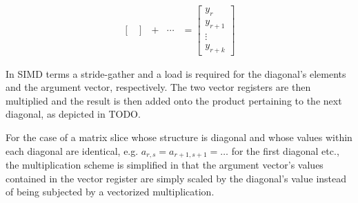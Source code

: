 \documentclass{article}
\begin{document}
\begin{equation}
\begin{matrix}
\begin{bmatrix}
                                                                              \end{bmatrix} & + & \cdots & = \begin{bmatrix}
                                                                                                                 y_{r} \\
                                                                                                                 y_{r+1} \\
                                                                                                                 \vdots \\
                                                                                                                 y_{r+k}
                                                                                                                \end{bmatrix}
        \end{matrix}
      \end{equation}

      In SIMD terms a stride-gather and a load is required for the diagonal's elements and the argument vector, respectively. The two vector registers are then multiplied and the result is then added onto the product pertaining to the next diagonal, as depicted in TODO.

      For the case of a matrix slice whose structure is diagonal and whose values within each diagonal are identical, e.g. $a_{r,s} = a_{r+1, s+1} = \ldots$ for the first diagonal etc., the multiplication scheme is simplified in that the argument vector's values contained in the vector register are simply scaled by the diagonal's value instead of being subjected by a vectorized multiplication.
\end{document}

